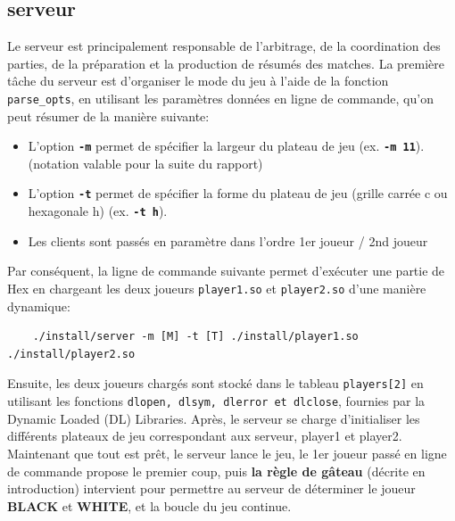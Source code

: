\documentclass[a4paper,10pt]{article}
\begin{document}
\subsection{serveur}
Le serveur est principalement responsable de l’arbitrage, de la coordination des parties, de la préparation et la production de résumés des matches. La première tâche du serveur est d’organiser le mode du jeu à l’aide de la fonction \texttt{parse\_opts}, en utilisant les paramètres données en ligne de commande,
 qu’on peut résumer de la manière suivante:
 \begin{itemize}
     \item  L'option \textbf{\texttt{-m}} permet de spécifier la largeur du plateau de jeu (ex. \textbf{\texttt{-m 11}}). (notation valable pour la suite du rapport)
    \item L'option \textbf{\texttt{-t}} permet de spécifier la forme du plateau de jeu (grille carrée c ou hexagonale h) (ex. \textbf{\texttt{-t h}}).
    \item Les clients sont passés en paramètre dans l'ordre 1er joueur / 2nd joueur
 \end{itemize}
 
Par conséquent, la ligne de commande suivante permet d'exécuter une partie de Hex en chargeant les deux joueurs \texttt{player1.so} et \texttt{player2.so} d'une manière dynamique:
\begin{verbatim}
    ./install/server -m [M] -t [T] ./install/player1.so ./install/player2.so
\end{verbatim}

Ensuite, les deux joueurs chargés sont stocké dans le tableau \texttt{players[2]}  en utilisant
les fonctions \texttt{dlopen, dlsym, dlerror et dlclose}, fournies par la Dynamic Loaded (DL) Libraries. Après, le serveur se charge d’initialiser les différents plateaux de jeu correspondant aux serveur, player1 et player2.\\
Maintenant que tout est prêt, le serveur lance le jeu, le 1er joueur passé en ligne de commande propose le premier coup, puis \textbf{la règle de gâteau} (décrite en introduction) intervient pour permettre au  serveur de déterminer le joueur \textbf{BLACK} et \textbf{WHITE}, et la boucle du jeu continue.\\
\end{document}

